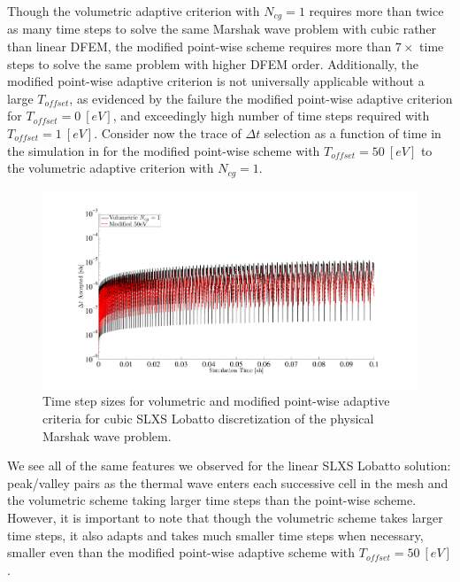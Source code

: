 Though the volumetric adaptive criterion with $N_{cg}=1$  requires more than twice as many time steps to solve the same Marshak wave problem with cubic rather than linear DFEM, the modified point-wise scheme requires more than $7\times$ time steps to solve the same problem with higher DFEM order. 
Additionally, the modified point-wise adaptive criterion is not universally applicable without a large $T_{offset}$, as evidenced by the failure the modified point-wise adaptive criterion for $T_{offset}=0~[eV]$, and exceedingly high number of time steps required with $T_{offset}=1~[eV]$.
Consider now the trace of $\Delta t$ selection as a function of time in the simulation in  for the modified point-wise scheme with $T_{offset}=50~[eV]$ to the volumetric adaptive criterion with $N_{cg}=1$.
\begin{figure}[!htp]
\centering
\includegraphics[width=16cm,trim=2in  0.4in 0.5in 0.75in,clip=true]{chapter6_grey_radtran/Dissertation_Data/Volumetric_1C_vs_50ev_in_time.pdf}
\caption{Time step sizes for volumetric and modified point-wise adaptive criteria for cubic SLXS Lobatto discretization of the physical Marshak wave problem.}
\label{fig:50ev_1C}
\end{figure}
We see all of the same features we observed for the linear SLXS Lobatto solution: peak/valley pairs as the thermal wave enters each successive cell in the mesh and the volumetric scheme taking larger time steps than the point-wise scheme.  
However, it is important to note that though the volumetric scheme takes larger time steps, it also adapts and takes much smaller time steps when necessary, smaller even than the modified point-wise adaptive scheme with $T_{offset}=50~[eV]$.

